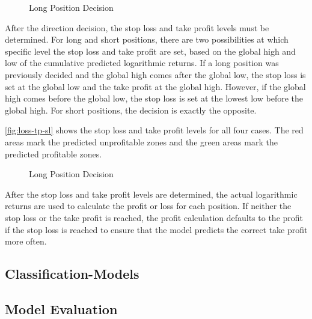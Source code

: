 \begin{figure}[H]
    \centering
    
    \caption{Long Position Decision}
    \label{fig:loss-long-position-decision}
\end{figure}

After the direction decision, the stop loss and take profit levels must be determined.
For long and short positions, there are two possibilities at which specific level the stop loss and take profit are set, based on the global high and low of the cumulative predicted logarithmic returns.
If a long position was previously decided and the global high comes after the global low, the stop loss is set at the global low and the take profit at the global high.
However, if the global high comes before the global low, the stop loss is set at the lowest low before the global high.
For short positions, the decision is exactly the opposite.

\autoref{fig:loss-tp-sl} shows the stop loss and take profit levels for all four cases.
The red areas mark the predicted unprofitable zones and the green areas mark the predicted profitable zones.

\begin{figure}[H]
    \centering
    
    \caption{Long Position Decision}
    \label{fig:loss-tp-sl}
\end{figure}

After the stop loss and take profit levels are determined, the actual logarithmic returns are used to calculate the profit or loss for each position.
If neither the stop loss or the take profit is reached, the profit calculation defaults to the profit if the stop loss is reached to ensure that the model predicts the correct take profit more often.

\subsection{Classification-Models}

\subsection{Model Evaluation}